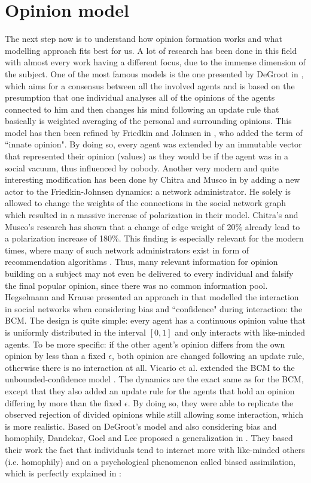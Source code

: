 \documentclass[12pt,a4paper,twoside]{article}
\begin{document}
\section{Opinion model}\label{sec:opinion_model}
The next step now is to understand how opinion formation works and what modelling approach fits best for us. A lot of research has been done in this field with almost every work having a different focus, due to the immense dimension of the subject. One of the most famous models is the one presented by DeGroot in \cite{Degroot1974}, which aims for a consensus between all the involved agents and is based on the presumption that one individual analyses all of the opinions of the agents connected to him and then changes his mind following an update rule that basically is weighted averaging of the personal and surrounding opinions. This model has then been refined by Friedkin and Johnsen in \cite{Friedkin1990}, who added the term of ``innate opinion". By doing so, every agent was extended by an immutable vector that represented their opinion (values) as they would be if the agent was in a social vacuum, thus influenced by nobody. Another very modern and quite interesting modification has been done by Chitra and Musco in \cite{Chitra2019} by adding a new actor to the Friedkin-Johnsen dynamics: a network administrator. He solely is allowed to change the weights of the connections in the social network graph which resulted in a massive increase of polarization in their model. Chitra's and Musco's research has shown that a change of edge weight of 20\% already lead to a polarization increase of 180\%. This finding is especially relevant for the modern times, where many of such network administrators exist in form of recommendation algorithms \cite{Pariser2011}. Thus, many relevant information for opinion building on a subject may not even be delivered to every individual and falsify the final popular opinion, since there was no common information pool. Hegselmann and Krause presented an approach in \cite{Hegselmann2002} that modelled the interaction in social networks when considering bias and ``confidence" during interaction: the \ac{BCM}. The design is quite simple: every agent has a continuous opinion value that is uniformly distributed in the interval $\left[0, 1\right]$ and only interacts with like-minded agents. To be more specific: if the other agent's opinion differs from the own opinion by less than a fixed $\epsilon$, both opinion are changed following an update rule, otherwise there is no interaction at all. Vicario et al. extended the \ac{BCM} to the unbounded-confidence model \cite{Vicario2016}. The dynamics are the exact same as for the \ac{BCM}, except that they also added an update rule for the agents that hold an opinion differing by more than the fixed $\epsilon$. By doing so, they were able to replicate the observed rejection of divided opinions while still allowing some interaction, which is more realistic. Based on DeGroot's model and also considering bias and homophily, Dandekar, Goel and Lee proposed a generalization in \cite{Dandekar2013}. They based their work the fact that individuals tend to interact more with like-minded others (i.e. homophily) and on a psychological phenomenon called biased assimilation, which is perfectly explained in \cite{Lord2009}: 
\end{document}
